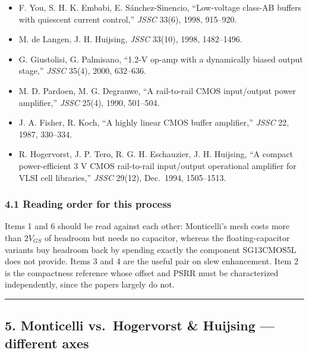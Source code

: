 \documentclass[
  10pt,
  a4paper,
]{article}
\providecommand{\tightlist}{%
  \setlength{\itemsep}{0pt}\setlength{\parskip}{0pt}}
\begin{document}
\begin{itemize}
\tightlist
\item
  F. You, S. H. K. Embabi, E. Sánchez-Sinencio, ``Low-voltage class-AB
  buffers with quiescent current control,'' \emph{JSSC} 33(6), 1998,
  915--920.
\item
  M. de Langen, J. H. Huijsing, \emph{JSSC} 33(10), 1998, 1482--1496.
\item
  G. Giustolisi, G. Palmisano, ``1.2-V op-amp with a dynamically biased
  output stage,'' \emph{JSSC} 35(4), 2000, 632--636.
\item
  M. D. Pardoen, M. G. Degrauwe, ``A rail-to-rail CMOS input/output
  power amplifier,'' \emph{JSSC} 25(4), 1990, 501--504.
\item
  J. A. Fisher, R. Koch, ``A highly linear CMOS buffer amplifier,''
  \emph{JSSC} 22, 1987, 330--334.
\item
  R. Hogervorst, J. P. Tero, R. G. H. Eschauzier, J. H. Huijsing, ``A
  compact power-efficient 3 V CMOS rail-to-rail input/output operational
  amplifier for VLSI cell libraries,'' \emph{JSSC} 29(12), Dec.~1994,
  1505--1513.
\end{itemize}

\hypertarget{reading-order-for-this-process}{%
\subsubsection{4.1 Reading order for this
process}\label{reading-order-for-this-process}}

Items 1 and 6 should be read against each other: Monticelli's mesh costs
more than \(2V_{GS}\) of headroom but needs no capacitor, whereas the
floating-capacitor variants buy headroom back by spending exactly the
component SG13CMOS5L does not provide. Items 3 and 4 are the useful pair
on slew enhancement. Item 2 is the compactness reference whose offset
and PSRR must be characterized independently, since the papers largely
do not.

\begin{center}\rule{0.5\linewidth}{0.5pt}\end{center}

\hypertarget{monticelli-vs.-hogervorst-huijsing-different-axes}{%
\subsection{5. Monticelli vs.~Hogervorst \& Huijsing --- different
axes}\label{monticelli-vs.-hogervorst-huijsing-different-axes}}
\end{document}
